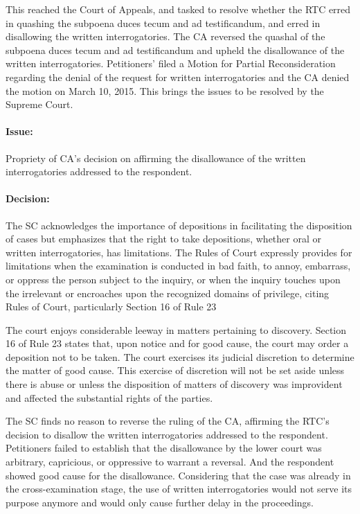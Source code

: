 \documentclass[
12pt,
oneside,
onehalfspacing,
headsepline
]{DigestCollection}
\begin{document}
This reached the Court of Appeals, and tasked to resolve whether the RTC erred in quashing the subpoena duces tecum and ad testificandum, and erred in disallowing the written interrogatories. The CA reversed the quashal of the subpoena duces tecum and ad testificandum and upheld the disallowance of the written interrogatories. Petitioners' filed a Motion for Partial Reconsideration regarding the denial of the request for written interrogatories and the CA denied the motion on March 10, 2015. This brings the issues to be resolved by the Supreme Court.

\paragraph{Issue:}
\label{f1367ab0-09fd-11ef-932c-63c852f65e48}


Propriety of CA's decision on affirming the disallowance of the written interrogatories addressed to the respondent.

\paragraph{Decision:}
\label{f3028820-09fd-11ef-932c-63c852f65e48}


The SC acknowledges the importance of depositions in facilitating the disposition of cases but emphasizes that the right to take depositions, whether oral or written interrogatories, has limitations. The Rules of Court expressly provides for limitations when the examination is conducted in bad faith, to annoy, embarrass, or oppress the person subject to the inquiry, or when the inquiry touches upon the irrelevant or encroaches upon the recognized domains of privilege, citing Rules of Court, particularly Section 16 of Rule 23

The court enjoys considerable leeway in matters pertaining to discovery. Section 16 of Rule 23 states that, upon notice and for good cause, the court may order a deposition not to be taken. The court exercises its judicial discretion to determine the matter of good cause. This exercise of discretion will not be set aside unless there is abuse or unless the disposition of matters of discovery was improvident and affected the substantial rights of the parties.

The SC finds no reason to reverse the ruling of the CA, affirming the RTC's decision to disallow the written interrogatories addressed to the respondent. Petitioners failed to establish that the disallowance by the lower court was arbitrary, capricious, or oppressive to warrant a reversal. And the respondent showed good cause for the disallowance. Considering that the case was already in the cross-examination stage, the use of written interrogatories would not serve its purpose anymore and would only cause further delay in the proceedings.
\end{document}
